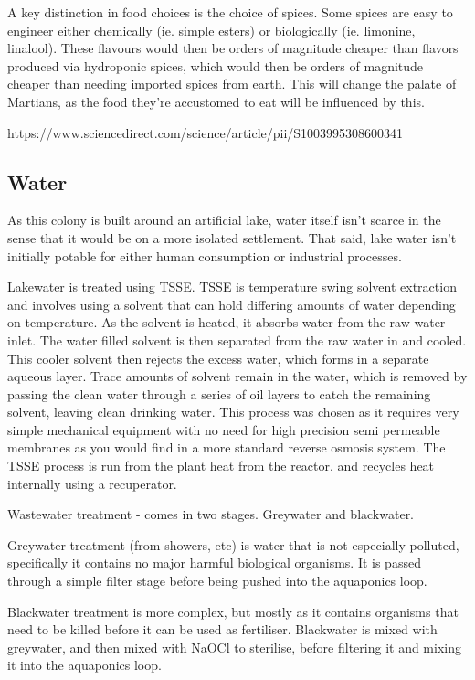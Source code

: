 \documentclass[10pt]{article}
\begin{document}
A key distinction in food choices is the choice of spices. Some spices are easy to engineer either chemically (ie. simple esters) or biologically (ie. limonine, linalool). These flavours would then be orders of magnitude cheaper than flavors produced via hydroponic spices, which would then be orders of magnitude cheaper than needing imported spices from earth. This will change the palate of Martians, as the food they're accustomed to eat will be influenced by this.

https://www.sciencedirect.com/science/article/pii/S1003995308600341



\subsection*{Water}

As this colony is built around an artificial lake, water itself isn't scarce in the sense that it would be on a more isolated settlement. That said, lake water isn't initially potable for either human consumption or industrial processes.

Lakewater is treated using TSSE. TSSE is temperature swing solvent extraction and involves using a solvent that can hold differing amounts of water depending on temperature. As the solvent is heated, it absorbs water from the raw water inlet. The water filled solvent is then separated from the raw water in and cooled. This cooler solvent then rejects the excess water, which forms in a separate aqueous layer. Trace amounts of solvent remain in the water, which is removed by passing the clean water through a series of oil layers to catch the remaining solvent, leaving clean drinking water. This process was chosen as it requires very simple mechanical equipment with no need for high precision semi permeable membranes as you would find in a more standard reverse osmosis system. The TSSE process is run from the plant heat from the reactor, and recycles heat internally using a recuperator.

Wastewater treatment - comes in two stages. Greywater and blackwater.

Greywater treatment (from showers, etc) is water that is not especially polluted, specifically it contains no major harmful biological organisms. It is passed through a simple filter stage before being pushed into the aquaponics loop.

Blackwater treatment is more complex, but mostly as it contains organisms that need to be killed before it can be used as fertiliser. Blackwater is mixed with greywater, and then mixed with NaOCl to sterilise, before filtering it and mixing it into the aquaponics loop.
\end{document}
